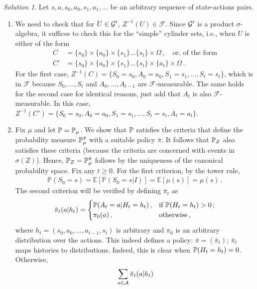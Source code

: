\documentclass{article}
\DeclareMathOperator*{\1}{\mathbbm{1}}
\newcommand{\E}{\mathbb E}
\newcommand{\Prob}[1]{\mathbb{P}( #1 )}
\newcommand{\EE}[1]{\E[#1]}
\newcommand{\cF}{\mathcal{F}}
\newcommand{\0}{\mathbf{0}}
\theoremstyle{definition}
\theoremstyle{remark}
\newtheorem*{solution*}{Solution}
\theoremstyle{theorem}
\newcommand{\cA}{\mathcal{A}}
\begin{document}
\begin{solution*}
Let $s,a,s_0,a_0,s_1,a_1,\dots$ be an arbitrary sequence of state-actions pairs.
\begin{enumerate}
\item We need to check that for $U\in \mathcal{G}'$, $Z^{-1}(U)\in \cF$.
Since $\mathcal{G}'$ is a product $\sigma$-algebra, it suffices to check this for the ``simple'' cylinder sets, i.e., when $U$
is either of the form
\begin{align*}
C   & = \{ s_0 \} \times \{ a_0 \} \times \{ s_1 \} \dots \{ s_t \} \times \Omega\,, \quad \text{or, of the form}\\
C' & = \{ s_0 \} \times \{ a_0 \} \times  \{ s_1 \} \dots \{ s_t \} \times \{a_t\}\times \Omega\,.
\end{align*}
For the first case, $Z^{-1}(C) = \{S_0=s_0,A_0=a_0,S_1=s_1,\dots,S_t=s_t\}$, which is in $\cF$ because $S_0,\dots,S_t$ and $A_0,\dots,A_{t-1}$ are $\cF$-measurable.
The same holds for the second case for identical reasons, just add that $A_t$ is also $\cF$-measurable.
In this case,
$Z^{-1}(C') = \{S_0=s_0,A_0=a_0,S_1=s_1,\dots,S_t=s_t,A_t=a_t\}$.
\item
Fix $\mu$ and let $\mathbb{P}=\mathbb{P}_\mu$.
We show that $\mathbb{P}$ satisfies the criteria that define
the probability measure $\mathbb{P}_{\mu}^{\bar \pi}$ with a suitable policy $\bar \pi$.
It follows that $\mathbb{P}_Z$ also satisfies these criteria (because the criteria are concerned with events in $\sigma(Z)$).
Hence, $\mathbb{P}_Z = \mathbb{P}_{\mu}^{\bar \pi}$ follows
by the uniqueness of the canonical probability space.
Fix any $t\ge 0$.
For the first criterion, by the tower rule,
\begin{align*}
\Prob{S_0=s} = \EE{ \Prob{S_0=s|I} } = \EE{ \mu(s) } = \mu(s)\,.
\end{align*}
The second criterion will be verified by defining $\bar \pi_t$ as
\begin{align*}
\bar \pi_t(a|h_t)=
\begin{cases}
\mathbb{P}(A_t=a|H_t=h_t)\,, & \text{if } \mathbb{P}(H_t=h_t)>0\,;\\
\pi_0(a)\,, & \text{otherwise}\,,
\end{cases}
\end{align*}
where $h_t = (s_0,a_0,\dots,a_{t-1},s_t)$ is arbitrary and $\pi_0$ is an arbitrary distribution over the actions.
This indeed defines a policy: $\bar \pi = (\bar \pi_t)$; $\bar \pi_t$ maps histories to distributions. Indeed,
this is clear when $\mathbb{P}(H_t=h_t)=0$. Otherwise,
\begin{align*}
\MoveEqLeft\sum_{a\in \cA} \bar \pi_t(a|h_t) \\

\end{align*}
\end{enumerate}
\end{solution*}
\end{document}
